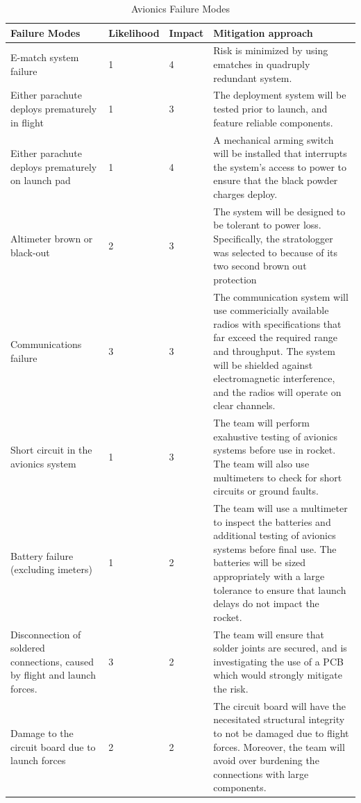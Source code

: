 \begin{table}[htbp]
    \centering
    \caption{Avionics Failure Modes}
    \begin{tabularx}{\linewidth}{X l l X}
        \toprule
        \textbf{Failure Modes} & \textbf{Likelihood} & \textbf{Impact} & \textbf{Mitigation approach} \\
        \midrule
        E-match system failure & 1     & 4     & Risk is minimized by using ematches in quadruply redundant system. \\
        Either parachute deploys prematurely in flight & 1     & 3     & The deployment system will be tested prior to launch, and feature reliable components.  \\
        Either parachute deploys prematurely on launch pad & 1     & 4     & A mechanical arming switch will be installed that interrupts the system's access to power to ensure that the black powder charges deploy.  \\
        Altimeter brown or black-out & 2     & 3     & The system will be designed to be tolerant to power loss. Specifically, the stratologger was selected to because of its two second brown out protection \\
        Communications failure & 3     & 3     & The communication system will use commericially available radios with specifications that far exceed the required range and throughput. The system will be shielded against electromagnetic interference, and the radios will operate on clear channels. \\
        Short circuit in the avionics system & 1     & 3     & The team will perform exahustive testing of avionics systems before use in rocket. The team will also use multimeters to check for short circuits or ground faults.  \\
        Battery failure (excluding imeters) & 1     & 2     & The team will use a multimeter to inspect the batteries and additional testing of avionics systems before final use. The batteries will be sized appropriately with a large tolerance to ensure that launch delays do not impact the rocket. \\
        Disconnection of soldered connections, caused by flight and launch forces. & 3     & 2     & The team will ensure that solder joints are secured, and is investigating the use of a PCB which would strongly mitigate the risk. \\
        Damage to the circuit board due to launch forces & 2     & 2     & The circuit board will have the necesitated structural integrity to not be damaged due to flight forces. Moreover, the team will avoid over burdening the connections with large components. \\
    \bottomrule
    \end{tabularx}%
    \label{tab:Avionics:FMEA}%
  \end{table}%
